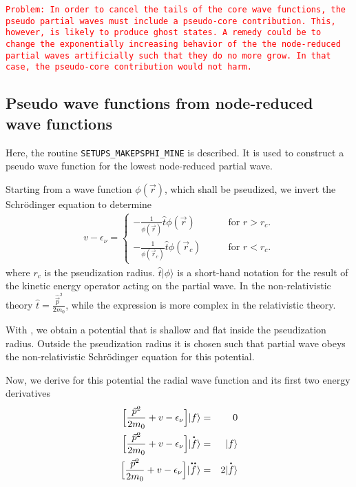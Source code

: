 \documentclass[11pt,a4paper]{report}
\newcommand{\petertt}[1]{\textcolor{red}{\texttt{#1}}}
\begin{document}
\petertt{Problem: In order to cancel the tails of the core wave
  functions, the pseudo partial waves must include a pseudo-core
  contribution. This, however, is likely to produce ghost states. A
  remedy could be to change the exponentially increasing behavior of
  the the node-reduced partial waves artificially such that they do no
  more grow. In that case, the pseudo-core contribution would not harm.}

\subsection{Pseudo wave functions from node-reduced wave functions}
\label{sec:determinedeltepseudo}
Here, the routine \verb|SETUPS_MAKEPSPHI_MINE| is described. It is used
to construct a pseudo wave function for the lowest node-reduced
partial wave.

Starting from a wave function $\phi(\vec{r})$, which shall be
pseudized, we invert the Schr\"odinger equation to determine
\begin{eqnarray}
v-\epsilon_\nu=
\begin{cases}
-\frac{1}{\phi(\vec{r})}\hat{t}\phi(\vec{r})&\qquad\text{for $r>r_c$.}
\\
-\frac{1}{\phi(\vec{r}_c)}\hat{t}\phi(\vec{r}_c)&\qquad\text{for $r<r_c$.}
\end{cases}
\label{eq:invertschrgl}
\end{eqnarray}
where $r_c$ is the pseudization radius. $\hat{t}|\phi\rangle$ is a
short-hand notation for the result of the kinetic energy operator
acting on the partial wave. In the non-relativistic theory
$\hat{t}=\frac{\hat{\vec{p}}^2}{2m_0}$, while the expression is more
complex in the relativistic theory.

With , we obtain a potential that is shallow and
flat inside the pseudization radius. Outside the pseudization radius
it is chosen such that partial wave obeys the non-relativistic
Schr\"odinger equation for this potential.

Now, we derive for this potential the radial wave function and its
first two energy derivatives
\begin{eqnarray}
\Bigl[\frac{\vec{p}^2}{2m_0}+v-\epsilon_\nu\Bigr]|f\rangle&=&0
\nonumber\\
\Bigl[\frac{\vec{p}^2}{2m_0}+v-\epsilon_\nu\Bigr]|\dot{f}\rangle&=&|f\rangle
\nonumber\\
\Bigl[\frac{\vec{p}^2}{2m_0}+v-\epsilon_\nu\Bigr]|\ddot{f}\rangle
&=&2|\dot{f}\rangle
\end{eqnarray}
\end{document}
